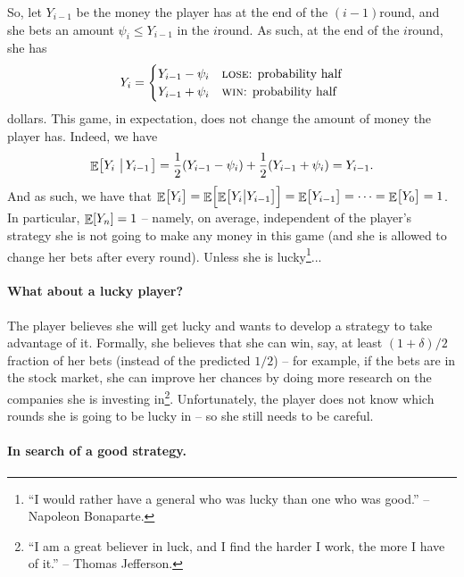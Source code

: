 So, let $Y_{i-1}$ be the money the player has at the end of the
$(i-1)$\th round, and she bets an amount $\psi_i \leq Y_{i-1}$ in the
$i$\th round.  As such, at the end of the $i$\th round, she has
\begin{align*}
    Y_{i} = \begin{cases}
        Y_{i-1} - \psi_{i} & \text{\textsc{lose}: probability half}\\
        Y_{i-1} + \psi_i & \text{\textsc{win}: probability half}
    \end{cases}
\end{align*}
dollars.  This game, in expectation, does not change the amount of
money the player has. Indeed, we have
\begin{align*}
    \Ex{Y_i\sep{Y_{i-1}}}%
    =%
    \frac{1}{2}\pth{ Y_{i-1} - \psi_i} + \frac{1}{2}\pth{Y_{i-1} +
       \psi_i}%
    =%
    Y_{i-1}.
\end{align*}
And as such, we have that
$\mathop{\mathbb{E}}\!\left[ {\bigl. Y_i} \right] = \mathop{\mathbb{E}}\!\left[ {\mathop{\mathbb{E}}\!\left[ {Y_{i}\bigl| {Y_{i-1}} } \right] \Bigl.\! } \right] = \mathop{\mathbb{E}}\!\left[ {
   \bigl. Y_{i-1}} \right] = \cdots = \mathop{\mathbb{E}}\!\left[ {Y_0 \bigl.} \right] = 1\Big.$. In
particular, $\mathop{\mathbb{E}}\!\left[ {Y_n} \right] = 1$ -- namely, on average, independent of the
player's strategy she is not going to make any money in this game (and
she is allowed to change her bets after every round). Unless she is
lucky\footnote{``I would rather have a general who was lucky than one
   who was good.'' -- Napoleon Bonaparte.}...




\paragraph*{What about a lucky player?}

The player believes she will get lucky and wants to develop a strategy
to take advantage of it.  Formally, she believes that she can win,
say, at least $(1+\delta)/2$ fraction of her bets (instead of the
predicted $1/2$) -- for example, if the bets are in the stock market,
she can improve her chances by doing more research on the companies
she is investing in\footnote{``I am a great believer in luck, and I
   find the harder I work, the more I have of it.'' -- Thomas
   Jefferson.}. Unfortunately, the player does not know which rounds
she is going to be lucky in -- so she still needs to be careful.


\paragraph*{In search of a good strategy.}

